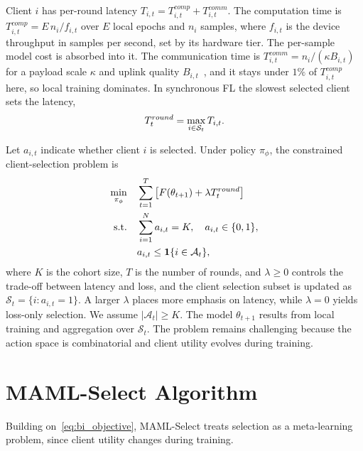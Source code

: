 \documentclass[journal]{IEEEtran}
\theoremstyle{remark}
\newcommand{\revision}[1]{#1}
\newcommand{\revtwo}[1]{#1}
\begin{document}
\revision{Client $i$ has per-round latency $T_{i,t}=T_{i,t}^{comp}+T_{i,t}^{comm}$.} \revtwo{The computation time is $T_{i,t}^{comp}=E\,n_i/f_{i,t}$ over $E$ local epochs and $n_i$ samples, where $f_{i,t}$ is the device throughput in samples per second, set by its hardware tier. The per-sample model cost is absorbed into it. The communication time is $T_{i,t}^{comm}=n_i/(\kappa B_{i,t})$ for a payload scale $\kappa$ and uplink quality $B_{i,t}$}~\cite{nishio2019client}\revtwo{, and it stays under $1\%$ of $T_{i,t}^{comp}$ here, so local training dominates.} \revision{In synchronous FL the slowest selected client sets the latency,}
\begin{equation}
	\color{black}
	T_t^{round} = \max_{i \in \mathcal{S}_t} T_{i,t}.
	\label{eq:round_latency}
\end{equation}


\revision{Let $a_{i,t}$ indicate whether client $i$ is selected. Under policy $\pi_\phi$, the constrained client-selection problem is}
\begin{equation}
	\color{black}
	\begin{aligned}
		\min_{\pi_\phi}\quad & \sum_{t=1}^{T} \left[F(\theta_{t+1}) + \lambda T_t^{round}\right] \\
		\text{s.t.}\quad & \sum_{i=1}^{N} a_{i,t}=K,\quad a_{i,t}\in\{0,1\}, \\
		& a_{i,t}\leq \mathbf{1}\{i\in\mathcal{A}_t\},		
	\end{aligned}
	\label{eq:bi_objective}
\end{equation}
\revision{where $K$ is the cohort size, $T$ is the number of rounds, and $\lambda \geq 0$ controls the trade-off between latency and loss, and the client selection subset is updated as $\mathcal{S}_t=\{i:a_{i,t}=1\}$. A larger $\lambda$ places more emphasis on latency, while $\lambda=0$ yields loss-only selection. We assume $|\mathcal{A}_t|\geq K$. The model $\theta_{t+1}$ results from local training and aggregation over $\mathcal{S}_t$. The problem remains challenging because the action space is combinatorial and client utility evolves during training.}

\section{MAML-Select Algorithm}
\revision{Building on~\eqref{eq:bi_objective}, MAML-Select treats selection as a meta-learning problem, since client utility changes during training.}
\end{document}

